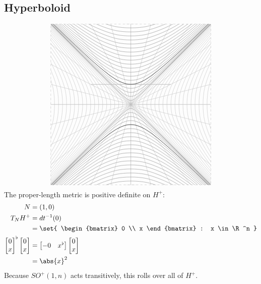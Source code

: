 \documentclass{scrartcl}
\begin{document}
\begin{multicols*}{2}
  \section{Hyperboloid}
  \[
    \begin{tikzpicture}
      \draw[dashed,lightgray] (-4,-4) rectangle (4,4);
      \clip                   (-4,-4) rectangle (4,4);
      \foreach \x  in {0,1,...,4}
      \draw[lightgray]
      (0,0) -- (\x,4)
      (0,0) -- (-\x,4)
      (0,0) -- (\x,-4)
      (0,0) -- (-\x,-4)
      (0,0) -- (4,\x)
      (0,0) -- (4,-\x)
      (0,0) -- (-4,\x)
      (0,0) -- (-4,-\x)
      ;
      \foreach \R in {0,.2,...,4}
      {
        \draw[lightgray,samples=20, domain=-4:4,smooth,variable=\t]
        plot ({\R * cosh \t},  {\R * sinh \t})
        plot ({- \R * cosh \t},{\R * sinh \t})
        ;
        \draw[     gray,samples=20, domain=-4:4,smooth,variable=\t]
        plot ({\R * sinh \t}, {\R * cosh \t})
        plot ({\R * sinh \t}, {- \R * cosh \t})
        ;
      }
      \draw[thick,lightgray] (-2,1) -- (2,1);
      \def\R{1}
      \draw[          samples=20, domain=-4:4,smooth,variable=\t]
      plot ({\R * sinh \t}, {\R * cosh \t})
      plot ({\R * sinh \t}, {- \R * cosh \t})
      ;
    \end{tikzpicture}
  \]
  The proper-length metric is positive definite on \(H^+\):
  \begin{align*}
    N &= (1,0) \\
    T_NH^+ &= dt^{-1}(0) \\
    &= \set{
      \begin{bmatrix}
        0 \\ x
      \end{bmatrix}
      : x  \in \R^n
      } \\
    \begin{bmatrix}
      0 \\x
    \end{bmatrix}^\flat
    \begin{bmatrix}
      0 \\x
    \end{bmatrix}
    &=
      \begin{bmatrix}
        -0 & x^\flat
      \end{bmatrix}
      \begin{bmatrix}
        0 \\ x
      \end{bmatrix} \\
    &= \abs{x}^2
  \end{align*}
  Because \(SO^+(1,n)\) acts transitively, this rolls over all of \(H^+\).


\end{multicols*}
\end{document}
